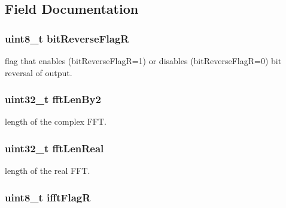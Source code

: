 \subsection{Field Documentation}
\hypertarget{structarm__rfft__instance__q31_ad56ec2425e2422108b8767b43d944591}{
\subsubsection[{bit\-Reverse\-Flag\-R}]{\setlength{\rightskip}{0pt plus 5cm}uint8\-\_\-t bit\-Reverse\-Flag\-R}}\label{structarm__rfft__instance__q31_ad56ec2425e2422108b8767b43d944591}
flag that enables (bit\-Reverse\-Flag\-R=1) or disables (bit\-Reverse\-Flag\-R=0) bit reversal of output. \hypertarget{structarm__rfft__instance__q31_ae7db13e0e2999656d98c4223de5b1284}{
\subsubsection[{fft\-Len\-By2}]{\setlength{\rightskip}{0pt plus 5cm}uint32\-\_\-t fft\-Len\-By2}}\label{structarm__rfft__instance__q31_ae7db13e0e2999656d98c4223de5b1284}
length of the complex F\-F\-T. \hypertarget{structarm__rfft__instance__q31_adf0d4604cf5546075d9d4cf122d6c986}{
\subsubsection[{fft\-Len\-Real}]{\setlength{\rightskip}{0pt plus 5cm}uint32\-\_\-t fft\-Len\-Real}}\label{structarm__rfft__instance__q31_adf0d4604cf5546075d9d4cf122d6c986}
length of the real F\-F\-T. \hypertarget{structarm__rfft__instance__q31_a787d72055c89e4d62b188d6bd646341c}{
\subsubsection[{ifft\-Flag\-R}]{\setlength{\rightskip}{0pt plus 5cm}uint8\-\_\-t ifft\-Flag\-R}}\label{structarm__rfft__instance__q31_a787d72055c89e4d62b188d6bd646341c}
